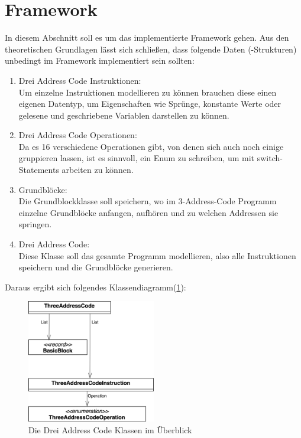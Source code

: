 \section{Framework}
In diesem Abschnitt soll es um das implementierte Framework gehen.
Aus den theoretischen Grundlagen lässt sich schließen, dass 
folgende Daten (-Strukturen) unbedingt im Framework implementiert sein sollten:

\begin{enumerate} \label{tac}
  \item Drei Address Code Instruktionen:\\ 
    Um einzelne Instruktionen modellieren zu können brauchen diese einen
    eigenen Datentyp, um Eigenschaften wie Sprünge, konstante Werte oder
    gelesene und geschriebene Variablen darstellen zu können.
  \item Drei Address Code Operationen:\\
    Da es 16 verschiedene Operationen gibt, von denen sich auch noch einige
    gruppieren lassen, ist es sinnvoll, ein Enum zu schreiben, um mit 
    switch-Statements arbeiten zu können.
  \item Grundblöcke:\\ 
    Die Grundblockklasse soll speichern, wo im 3-Address-Code Programm
    einzelne Grundblöcke anfangen, aufhören und zu welchen Addressen sie springen.
  \item Drei Address Code: \\ 
    Diese Klasse soll das gesamte Programm modellieren, also alle Instruktionen
    speichern und die Grundblöcke generieren.
\end{enumerate}
Daraus ergibt sich folgendes Klassendiagramm(\cref{fig:3AC-classes}):
\begin{figure}[h]
  \centering
  \includegraphics[width=0.5\textwidth]{fig/3AC_classes.png}
  \caption{Die Drei Address Code Klassen im Überblick}%
  \label{fig:3AC-classes}
\end{figure}


